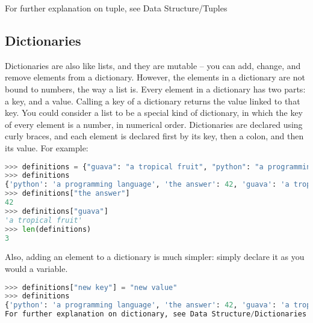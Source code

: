 For further explanation on tuple, see Data Structure/Tuples

\subsection{Dictionaries}
Dictionaries are also like lists, and they are mutable -- you can add, change,
and remove elements from a dictionary. However, the elements in a dictionary are
not bound to numbers, the way a list is. Every element in a dictionary has two
parts: a key, and a value. Calling a key of a dictionary returns the value
linked to that key. You could consider a list to be a special kind of
dictionary, in which the key of every element is a number, in numerical order.
Dictionaries are declared using curly braces, and each element is declared first
by its key, then a colon, and then its value. For example:
\lstset{basicstyle=\scriptsize, numbers=left, captionpos=b, tabsize=4}
\begin{lstlisting}[caption=Dictionary Definition,language={Python},
xleftmargin=15pt, label=lst:dictonarydefinition]
>>> definitions = {"guava": "a tropical fruit", "python": "a programming language", "the answer": 42}
>>> definitions
{'python': 'a programming language', 'the answer': 42, 'guava': 'a tropical fruit'}
>>> definitions["the answer"]
42
>>> definitions["guava"]
'a tropical fruit'
>>> len(definitions)    
3
\end{lstlisting}

Also, adding an element to a dictionary is much simpler: simply declare it as you would a variable.
\lstset{basicstyle=\scriptsize, numbers=left, captionpos=b, tabsize=4}
\begin{lstlisting}[caption=Dictionary Insert,language={Python},
xleftmargin=15pt, label=lst:dictionaryinsert]
>>> definitions["new key"] = "new value"
>>> definitions
{'python': 'a programming language', 'the answer': 42, 'guava': 'a tropical fruit', 'new key': 'new value'}
For further explanation on dictionary, see Data Structure/Dictionaries
\end{lstlisting}

